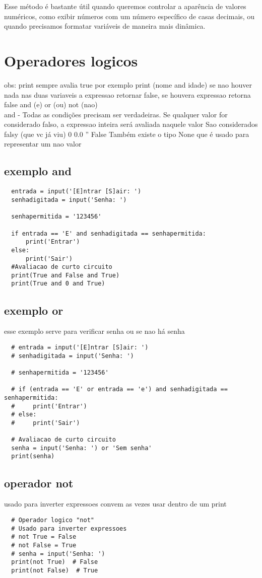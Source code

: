 \documentclass{article}
\begin{document}
Esse método é bastante útil quando queremos controlar a aparência de valores numéricos, como exibir números com um número específico de casas decimais, ou quando precisamos formatar variáveis de maneira mais dinâmica.

\section{Operadores logicos}
obs: print sempre avalia true por exemplo print (nome and idade) se nao houver nada nas duas variaveis 
a expressao retornar false, se houvera expressao retorna false
and (e) or (ou) not (nao)\\
 and - Todas as condições precisam ser
 verdadeiras.
 Se qualquer valor for considerado falso,
 a expressao inteira será avaliada naquele valor
 Sao considerados falsy (que vc já viu)
 0 0.0 '' False
 Também existe o tipo None que é
 usado para representar um nao valor\\
  \subsection{exemplo and}
  \begin{lstlisting}
  entrada = input('[E]ntrar [S]air: ')
  senhadigitada = input('Senha: ')

  senhapermitida = '123456'

  if entrada == 'E' and senhadigitada == senhapermitida:
      print('Entrar')
  else:
      print('Sair')
  #Avaliacao de curto circuito
  print(True and False and True)
  print(True and 0 and True)
  \end{lstlisting}
  \subsection{exemplo or}
  esse exemplo serve para verificar senha ou se nao há senha
  \begin{lstlisting}
  # entrada = input('[E]ntrar [S]air: ')
  # senhadigitada = input('Senha: ')

  # senhapermitida = '123456'

  # if (entrada == 'E' or entrada == 'e') and senhadigitada == senhapermitida:
  #     print('Entrar')
  # else:
  #     print('Sair')

  # Avaliacao de curto circuito
  senha = input('Senha: ') or 'Sem senha'
  print(senha)
  \end{lstlisting} 
  \subsection{operador not}
  usado para inverter expressoes convem as vezes usar dentro de um print 
  \begin{lstlisting}
  # Operador logico "not"
  # Usado para inverter expressoes
  # not True = False
  # not False = True
  # senha = input('Senha: ')
  print(not True)  # False
  print(not False)  # True
  \end{lstlisting} 
\end{document}
